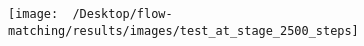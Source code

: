 \documentclass{article}
\begin{document}
\texttt{[image: ~/Desktop/flow-matching/results/images/test\_at\_stage\_2500\_steps]}
\end{document}
